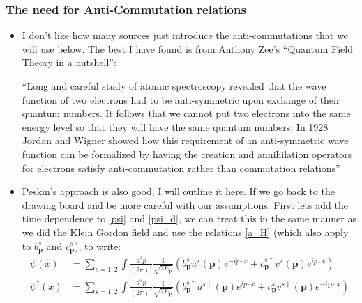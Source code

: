 \documentclass[11pt]{article}
\numberwithin{equation}{section}
\begin{document}
\subsubsection{The need for Anti-Commutation relations}{\label{need_anti}}
\begin{itemize}
  \item I don't like how many sources just introduce the anti-commutations that we will use below. The best I have found is from Anthony Zee's ``Quantum Field Theory in a nutshell'': 

  ``Long and careful study of atomic spectroscopy revealed that the wave function of two electrons had to be anti-symmetric upon exchange of their quantum numbers. It follows that we cannot put two electrons into the same energy level so that they will have the same quantum numbers. In 1928 Jordan and Wigner showed how this requirement of an anti-symmetric wave function can be formalized by having the creation and annihilation operators for electrons satisfy anti-commutation rather than commutation relations''

\item Peskin's  approach is also good, I will outline it here. If we go back to the drawing board and be more careful with our assumptions. First lets add the time dependence to \ref{psi} and \ref{psi_d}, we can treat this in the same manner as we did the Klein Gordon field and use the relations \ref{a_H} (which also apply to $b^{s}_{\textbf{p}}$ and $c^{s}_{\textbf{p}}$), to write: 
\begin{align}
\label{psi_dag}
      \psi(x) &= \sum_{s=1,2}\int \frac{d^3p}{(2\pi)^3}\frac{1}{\sqrt{2E_{\textbf{p}}}}\left(b^{s}_{\textbf{p}}u^s(\textbf{p})e^{-ip\cdot x}+c^{s \dagger}_{\textbf{p}}v^s(\textbf{p})e^{ip\cdot x}\right)  \\
      \psi^{\dagger}(x) &= \sum_{s=1,2}\int \frac{d^3p}{(2\pi)^3}\frac{1}{\sqrt{2E_{\textbf{p}}}}\left(b^{s \dagger}_{\textbf{p}}u^{s\dagger}(\textbf{p})e^{ip\cdot x}+c^{s }_{\textbf{p}}v^{s\dagger}(\textbf{p})e^{-i\textbf{p}\cdot\textbf{x}}\right)
 \end{align} 


\end{itemize}
\end{document}
